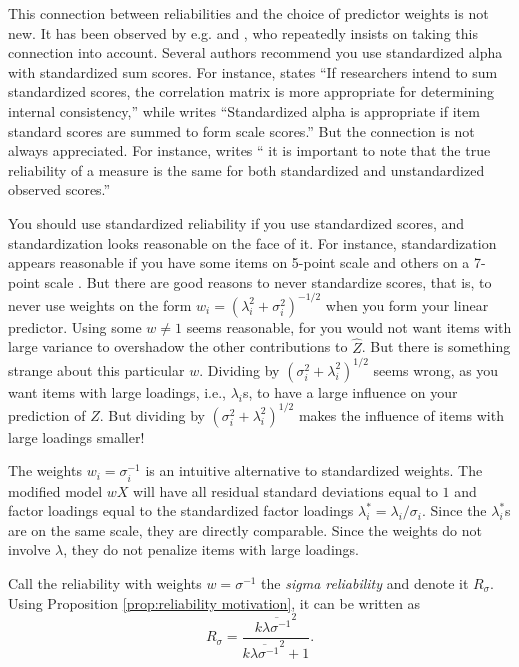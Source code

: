 \documentclass[twoside]{article}
\begin{document}
This connection between reliabilities and the choice of predictor
weights is not new. It has been observed by e.g. \citet[][p. 112]{Joreskog1971-nn} and \citet{McNeish2018-vu}, who repeatedly insists on taking this connection into account. Several authors recommend you use standardized alpha with standardized sum scores. For instance, \citet[][p. 451]{Falk2011-ae} states \enquote{If researchers intend to sum
standardized scores, the correlation matrix is more appropriate for determining internal consistency,} while \citet[][p. 99]{Cortina1993-aq} writes \enquote{Standardized alpha is appropriate if item standard scores are summed to form scale scores.} But the connection is not always appreciated. For instance, \citet[][p.348]{Osburn2000-jd} writes
\enquote{\textelp{} it is important to note that the true reliability of a measure is the same for both standardized and unstandardized observed scores.}

You should use standardized reliability if you use standardized scores, and standardization looks reasonable on the face of it. For instance, standardization appears reasonable if you have some items on 5-point scale and others on a 7-point scale \citep[p. 139]{Furr2013-yu}. But there are good reasons to never standardize scores, that is, to never use weights on the form $w_{i}=(\lambda_{i}^{2}+\sigma_{i}^{2})^{-1/2}$ when you form your linear predictor.
Using some $w\ne1$ seems reasonable, for you would not want items
with large variance to overshadow the other contributions to $\hat{Z}$.
But there is something strange about this particular $w$. Dividing by $(\sigma_{i}^{2}+\lambda_{i}^{2})^{1/2}$
seems wrong, as you want items with large loadings, i.e., $\lambda_{i}$s, to have a large
influence on your prediction of $Z$. But dividing by $(\sigma_{i}^{2}+\lambda_{i}^{2})^{1/2}$
makes the influence of items with large loadings smaller!

The weights $w_i=\sigma_{i}^{-1}$ is an intuitive alternative to standardized weights. The modified model $wX$ will have all residual standard deviations equal to $1$ and factor loadings equal to the standardized factor loadings $\lambda_i^* = \lambda_i/\sigma_i$. Since the $\lambda_i^*$s are on the same scale, they are directly comparable. Since the weights do not involve $\lambda$, they do not penalize items with large loadings. 

Call the reliability with weights $w=\sigma^{-1}$ the \textit{sigma reliability} and denote it $ R_\sigma$. Using Proposition \ref{prop:reliability motivation}, it can be written as
\begin{equation}
 R_\sigma=\frac{k\overline{\lambda\sigma^{-1}}^{2}}{k\overline{\lambda\sigma^{-1}}^{2}+1}.\label{eq:Sigma-standardized reliability}
\end{equation}
\end{document}

